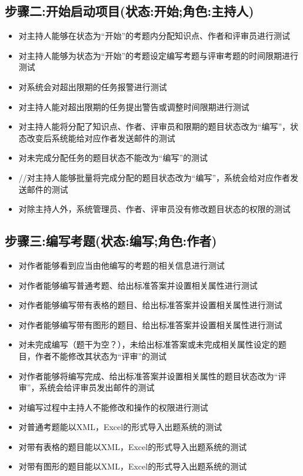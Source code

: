 \documentclass[hyperref, a4paper]{ctexart}
\providecommand{\tightlist}{%
  \setlength{\itemsep}{0pt}\setlength{\parskip}{0pt}}
\begin{document}
\hypertarget{ux6b65ux9aa4ux4e8cux5f00ux59cbux542fux52a8ux9879ux76eeux72b6ux6001ux5f00ux59cbux89d2ux8272ux4e3bux6301ux4eba}{%
\subsection{步骤二:开始启动项目(状态:开始;角色:主持人)}\label{ux6b65ux9aa4ux4e8cux5f00ux59cbux542fux52a8ux9879ux76eeux72b6ux6001ux5f00ux59cbux89d2ux8272ux4e3bux6301ux4eba}}

\begin{itemize}
\item
  对主持人能够在状态为``开始''的考题内分配知识点、作者和评审员进行测试
\item
  对主持人能够为状态为``开始''的考题设定编写考题与评审考题的时间限期进行测试
\item
  对系统会对超出限期的任务报警进行测试
\item
  对主持人能对超出限期的任务提出警告或调整时间限期进行测试
\item
  对主持人能将分配了知识点、作者、评审员和限期的题目状态改为``编写''，状态改变后系统能给对应作者发送邮件的测试
\item
  对未完成分配任务的题目状态不能改为``编写''的测试
\item
  //对主持人能够批量将完成分配的题目状态改为``编写''，系统会给对应作者发送邮件的测试
\item
  对除主持人外，系统管理员、作者、评审员没有修改题目状态的权限的测试
\end{itemize}

\hypertarget{ux6b65ux9aa4ux4e09ux7f16ux5199ux8003ux9898ux72b6ux6001ux7f16ux5199ux89d2ux8272ux4f5cux8005}{%
\subsection{步骤三:编写考题(状态:编写;角色:作者)}\label{ux6b65ux9aa4ux4e09ux7f16ux5199ux8003ux9898ux72b6ux6001ux7f16ux5199ux89d2ux8272ux4f5cux8005}}

\begin{itemize}
\tightlist
\item
  对作者能够看到应当由他编写的考题的相关信息进行测试
\item
  对作者能够编写普通考题、给出标准答案并设置相关属性进行测试
\item
  对作者能够编写带有表格的题目、给出标准答案并设置相关属性进行测试
\item
  对作者能够编写带有图形的题目、给出标准答案并设置相关属性进行测试
\item
  对未完成编写（题干为空？），未给出标准答案或未完成相关属性设定的题目，作者不能修改其状态为``评审''的测试
\item
  对作者能够将编写完成、给出标准答案并设置相关属性的题目状态改为``评审''，系统会给评审员发出邮件的测试
\item
  对编写过程中主持人不能修改和操作的权限进行测试
\item
  对普通考题能以XML，Excel的形式导入出题系统的测试
\item
  对带有表格的题目能以XML，Excel的形式导入出题系统的测试
\item
  对带有图形的题目能以XML，Excel的形式导入出题系统的测试
\end{itemize}
\end{document}
